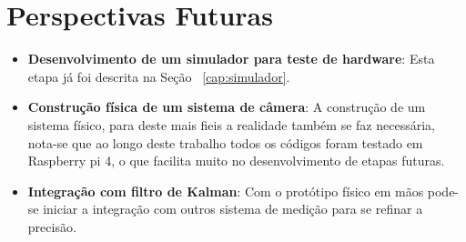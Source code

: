 \section*{Perspectivas Futuras}

\begin{itemize}
	\item \textbf{Desenvolvimento de um simulador para teste de hardware}: Esta etapa já foi descrita na Seção ~\ref{cap:simulador}.
	\item \textbf{Construção física de um sistema de câmera}: A construção de um sistema físico, para deste mais fieis a realidade também se faz necessária, 
	nota-se que ao longo deste trabalho todos os códigos foram testado em Raspberry pi 4, o que facilita muito no desenvolvimento de etapas futuras. 
	\item \textbf{Integração com filtro de Kalman}: Com o protótipo físico em mãos pode-se iniciar a integração com outros sistema de medição para se refinar a precisão.
\end{itemize}